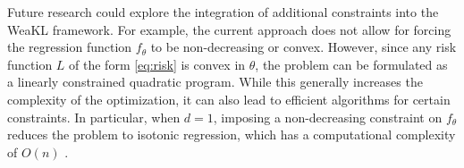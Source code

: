 Future research could explore the integration of additional constraints into the WeaKL framework. For example, the current approach does not allow for forcing the regression function $f_\theta$ to be non-decreasing or convex. However, since any risk function $L$ of the form \eqref{eq:risk} is convex in $\theta$, the problem can be formulated as a linearly constrained quadratic program. While this generally increases the complexity of the optimization, it can also lead to efficient algorithms for certain constraints. In particular, when $d=1$, imposing a non-decreasing constraint on $f_\theta$ reduces the problem to isotonic regression, which has a computational complexity of $O(n)$ \citep{wright1980isotonic}.